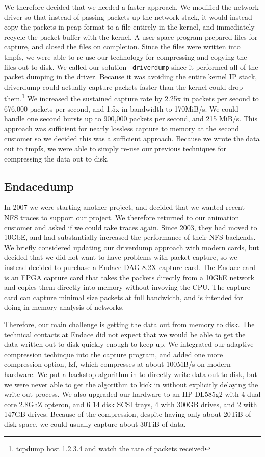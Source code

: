 We therefore decided that we needed a faster approach.  We modified
the network driver so that instead of passing packets up the network
stack, it would instead copy the packets in pcap format to a file
entirely in the kernel, and immediately recycle the packet buffer with
the kernel.  A user space program prepared files for capture, and
closed the files on completion.  Since the files were written into
tmpfs, we were able to re-use our technology for compressing and
copying the files out to disk.  We called our solution {\tt
driverdump} since it performed all of the packet dumping in the
driver.  Because it was avoiding the entire kernel IP stack,
driverdump could actually capture packets faster than the kernel could
drop them.\footnote{tcpdump host 1.2.3.4 and watch the rate of packets
received} We increased the sustained capture rate by 2.25x in packets
per second to 676,000 packets per second, and 1.5x in bandwidth to
170MiB/s.  We could handle one second bursts up to 900,000 packets per
second, and 215 MiB/s.  This approach was sufficient for nearly
lossless capture to memory at the second customer so we decided this
was a sufficient approach.  Because we wrote the data out to tmpfs, we
were able to simply re-use our previous techniques for compressing the
data out to disk.

\subsection{Endacedump}

In 2007 we were starting another project, and decided that we wanted
recent NFS traces to support our project.  We therefore returned to
our animation customer and asked if we could take traces again.  Since
2003, they had moved to 10GbE, and had substantially increased the
performance of their NFS backends.  We briefly considered updating our
driverdump approach with modern cards, but decided that we did not
want to have problems with packet capture, so we instead decided to
purchase a Endace DAG 8.2X capture card.  The Endace card is an FPGA
capture card that takes the packets directly from a 10GbE network and
copies them directly into memory without invoving the CPU.  The
capture card can capture minimal size packets at full bandwidth, and
is intended for doing in-memory analysis of networks.

Therefore, our main challenge is getting the data out from memory to
disk.  The technical contacts at Endace did not expect that we would
be able to get the data written out to disk quickly enough to keep up.
We integrated our adaptive compression techinque into the capture
program, and added one more compression option, lzf, which compresses
at about 100MB/s on modern hardware.  We put a backstop algorithm in
to directly write data out to disk, but we were never able to get the
algorithm to kick in without explicitly delaying the write out
process.  We also upgraded our hardware to an HP DL585g2 with 4 dual
core 2.8GhZ opteron, and 6 14 disk SCSI trays, 4 with 300GB drives,
and 2 with 147GB drives.  Because of the compression, despite having
only about 20TiB of disk space, we could usually capture about 30TiB
of data.

